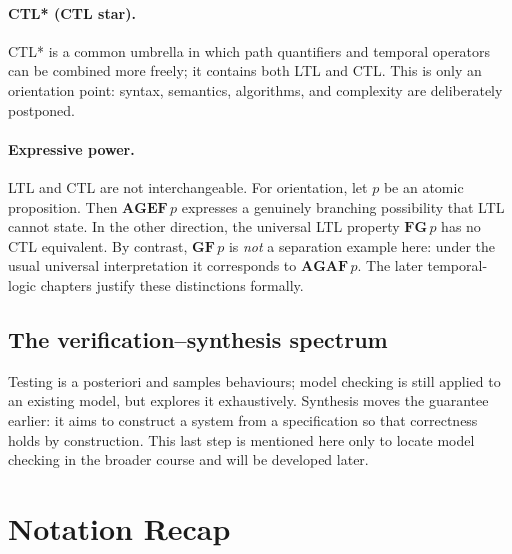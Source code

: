 \paragraph{CTL* (CTL star).}
CTL* is a common umbrella in which path quantifiers and temporal operators
can be combined more freely; it contains both LTL and CTL.  This is only an
orientation point: syntax, semantics, algorithms, and complexity are
deliberately postponed.

\paragraph{Expressive power.}
LTL and CTL are not interchangeable.  For orientation, let \(p\) be an
atomic proposition.  Then
\(\mathbf{AG}\mathbf{EF}\,p\) expresses a genuinely branching possibility
that LTL cannot state.  In the other direction, the universal LTL property
\(\mathbf{F}\mathbf{G}\,p\) has no CTL equivalent.  By contrast,
\(\mathbf{G}\mathbf{F}\,p\) is \emph{not} a separation example here: under
the usual universal interpretation it corresponds to
\(\mathbf{AG}\mathbf{AF}\,p\).  The later temporal-logic chapters justify
these distinctions formally.

\subsection{The verification--synthesis spectrum}

Testing is a posteriori and samples behaviours; model checking is still
applied to an existing model, but explores it exhaustively.  Synthesis moves
the guarantee earlier: it aims to construct a system from a specification so
that correctness holds by construction.  This last step is mentioned here
only to locate model checking in the broader course and will be developed
later.

\section*{Notation Recap}

